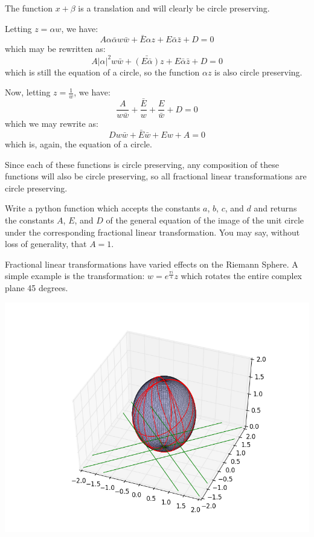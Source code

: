 The function $x+\beta$ is a translation and will clearly be circle preserving.

Letting $z=\alpha w$, we have: 
$$A\alpha \bar{\alpha} w\bar{w}+\bar{E}\alpha z+E\bar{\alpha} \bar{z}+D=0$$
which may be rewritten as:
$$A|\alpha|^2 w\bar{w}+\bar{(E\bar{\alpha})}z+E\bar{\alpha} \bar{z}+D=0$$
which is still the equation of a circle, so the function $\alpha z$ is also circle preserving.

Now, letting $z=\frac{1}{w}$, we have:
$$\frac{A}{w\bar{w}}+\frac{\bar{E}}{w}+\frac{E}{\bar{w}}+D=0$$
which we may rewrite as:
$$Dw\bar{w}+\bar{E}\bar{w}+Ew+A=0$$
which is, again, the equation of a circle.

Since each of these functions is circle preserving, any composition of these functions will also be circle preserving, so all fractional linear transformations are circle preserving.

\begin{problem}
Write a python function which accepts the constants $a$, $b$, $c$, and $d$ and returns the constants $A$, $E$, and $D$ of the general equation of the image of the unit circle under the corresponding fractional linear transformation. You may say, without loss of generality, that $A=1$.
\end{problem}

Fractional linear transformations have varied effects on the Riemann Sphere. A simple example is the transformation: $w=e^{\frac{\pi i}{4}}z$ which rotates the entire complex plane 45 degrees.

\includegraphics[width=\textwidth]{mobius4.png}

